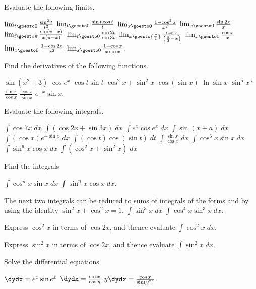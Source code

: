\begin{exercises}

Evaluate the following limits.
\begin{exenum}
\x
$\lim_{t\goesto0} \frac{\sin^2t}{t^2}$
\x
$\lim_{t\goesto0} \frac{\sin t \cos t}{t}$
\x
$\lim_{x\goesto0} \frac{1-\cos^2 x}{x^2}$
\x
$\lim_{x\goesto0} \frac{\sin 2x}{x}$
\x
$\lim_{t\goesto\pi} \frac{\sin(\pi - x)}{x(\pi - x)}$
\x
$\lim_{t\goesto0} \frac{\sin2t}{\sin3t}$
\x
$\lim_{x\goesto{\frac{\pi}2}} 
\frac{\cos x}{\left(\frac{\pi}2 - x\right)}$
\x
$\lim_{x\goesto0} \frac{\cos x}{x}$
\x
$\lim_{x\goesto0} \frac{1 - \cos 2x}{x^2}$
\x
$\lim_{x\goesto0} \frac{1 - \cos x}{x \sin x}$.
\end{exenum}

Find the derivatives of the following functions.
\begin{exenum}
\x
$\sin(x^2+3)$
\x
$\cos e^x$
\x
$\cos t \sin t$
\x
$\cos^2x + \sin^2x$
\x
$\cos(\sin x)$
\x
$\ln \sin x$
\x
$\sin^5x^5$
\x
$\frac{\sin x}{\cos x}$
\x
$\frac{\cos x}{\sin x}$
\x
$e^{-x} \sin x$.
\end{exenum}

Evaluate the following integrals.
\begin{exenum}
\x
$\int \cos 7x \; dx$
\x
$\int (\cos 2x + \sin 3x) \; dx$
\x
$\int e^x \cos e^x \; dx$
\x
$\int \sin(x+a) \; dx$
\x
$\int (\cos x)e^{-\sin x} \; dx$
\x
$\int (\cos t)\cos(\sin t) \; dt$
\x
$\int \frac{\sin x}{\cos x} \; dx$
\x
$\int \cos^6x \sin x \; dx$
\x
$\int \sin^6x \cos x \; dx$
\x
$\int (\cos^2 x + \sin^2 x) \; dx$
\end{exenum}

Find the integrals
\begin{exenum}
\x
{}
$\int \cos^n x \sin x \; dx$
\x
{}
$\int \sin^n x \cos x \; dx$.

The next two integrals can be reduced to sums
of integrals of the forms  and 
by using the identity
$\sin^2 x + \cos^2 x = 1$.
\x
$\int \sin^3 x \; dx$
\x
$\int \cos^4 x \sin^3 x \; dx$.
\end{exenum}

Express $\cos^2 x$ in terms of $\cos 2x$,
and thence evaluate $\int \cos^2 x \; dx$.

Express $\sin^2 x$ in terms of $\cos 2x$,
and thence evaluate $\int \sin^2 x \; dx$.

Solve the differential equations
\begin{exenum}
\x
$\dydx = e^x \sin e^x$
\x
$\dydx = \frac{\sin x}{\cos y}$
\x
$y \dydx = \frac{\cos x}{\sin (y^2)}$.
\end{exenum}


\end{exercises}
